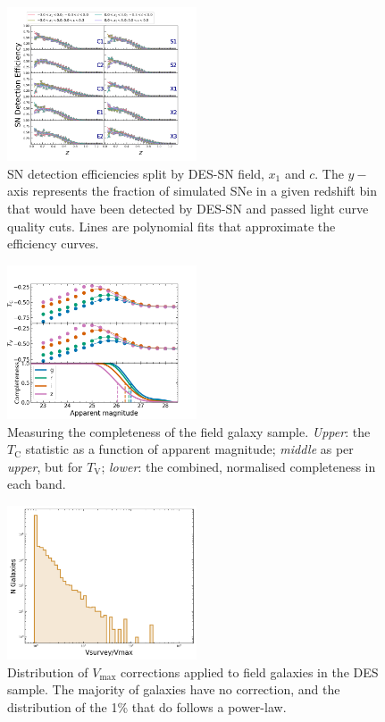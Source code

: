 \documentclass[fleqn,usenatbib]{mnras}
\begin{document}
\begin{figure}
    \centering
    \includegraphics[width=0.5\textwidth]{figs/SN_efficiencies_z_x1_c.png}
    \caption{ SN detection efficiencies split by DES-SN field, $x_1$ and $c$. The $y-$axis represents the fraction of simulated SNe in a given redshift bin that would have been detected by DES-SN and passed light curve quality cuts. Lines are polynomial fits that approximate the efficiency curves. 
    \label{fig:SN_efficiency}}
\end{figure}

\begin{figure}
    \centering
    \includegraphics[width=0.5\textwidth]{figs/completeness_combined.png}
    \caption{Measuring the completeness of the field galaxy sample. \textit{Upper}: the $T_{\mathrm{C}}$ statistic as a function of apparent magnitude; \textit{middle} as per \textit{upper}, but for $T_{\mathrm{V}}$; \textit{lower}: the combined, normalised completeness in each band.  
    \label{fig:completeness}}
\end{figure}

\begin{figure}
    \centering
    \includegraphics[width=0.5\textwidth]{figs/field_vmax.png}
    \caption{Distribution of $V_{\mathrm{max}}$ corrections applied to field galaxies in the DES sample. The majority of galaxies have no correction, and the distribution of the 1\% that do follows a power-law.
    \label{fig:vmax_field}}
\end{figure}
\end{document}
